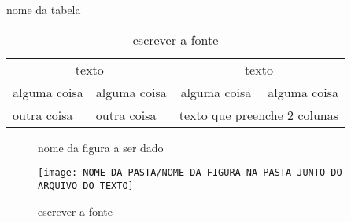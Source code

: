 \documentclass[a4paper,12pt]{article} %
\begin{document}
\listoftables %
\begin{table}[!x]  %
   \centering  %
   \caption{nome da tabela}  %
   \begin{tabular}{l{}p{}c{}r{}}
      \multicolumn{2}{c}{texto} & \multicolumn{2}{c}{texto} \\  %
      alguma coisa & alguma coisa & alguma coisa & alguma coisa \\
      \hline %
      outra coisa  & outra coisa  & \multicolumn{2}{c}{texto que preenche 2 colunas} \\ 
      \cline{i-j} %
   \end{tabular}
   \caption*{escrever a fonte}  %
   \label{nome para referência} %
\end{table}
\usepackage{booktabs} 
\addlinespace[xpt] %
\toprule  \midrule  \bottomrule


\listoffigures %
\begin{figure}[!x]  %
   \centering %
   \caption{nome da figura a ser dado} %
   \texttt{[image: NOME DA PASTA/NOME DA FIGURA NA PASTA JUNTO DO ARQUIVO DO TEXTO]}
   \caption*{escrever a fonte}  %
   \label{nome para referência} %
\end{figure}
\end{document}
